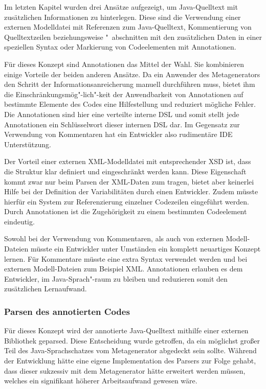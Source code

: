 \documentclass[12pt,oneside,a4paper,parskip]{scrbook}
\begin{document}
Im letzten Kapitel wurden drei Ansätze aufgezeigt, um Java-Quelltext mit zusätzlichen Informationen zu hinterlegen. Diese sind die Verwendung einer externen Modelldatei mit Referenzen zum Java-Quelltext, Kommentierung von Quelltextzeilen beziehungsweise "~abschnitten mit den zusätzlichen Daten in einer speziellen Syntax oder Markierung von Codeelementen mit Annotationen.

Für dieses Konzept sind Annotationen das Mittel der Wahl. Sie kombinieren einige Vorteile der beiden anderen Ansätze. Da ein Anwender des Metagenerators den Schritt der Informationsanreicherung manuell durchführen muss, bietet ihm die Einschränkungsmög"-lich"-keit der Anwendbarkeit von Annotationen auf bestimmte Elemente des Codes eine Hilfestellung und reduziert mögliche Fehler. Die Annotationen sind hier eine verteilte interne DSL und somit stellt jede Annotationen ein Schlüsselwort dieser internen DSL dar. Im Gegensatz zur Verwendung von Kommentaren hat ein Entwickler also rudimentäre IDE Unterstützung.

Der Vorteil einer externen XML-Modelldatei mit entsprechender XSD ist, dass die Struktur klar definiert und eingeschränkt werden kann. Diese Eigenschaft kommt zwar nur beim Parsen der XML-Daten zum tragen, bietet aber keinerlei Hilfe bei der Definition der Variabilitäten durch einen Entwickler. Zudem müsste hierfür ein System zur Referenzierung einzelner Codezeilen eingeführt werden. Durch Annotationen ist die Zugehörigkeit zu einem bestimmten Codeelement eindeutig.

Sowohl bei der Verwendung von Kommentaren, als auch von externen Modell-Dateien müsste ein Entwickler unter Umständen ein komplett neuartiges Konzept lernen. Für Kommentare müsste eine extra Syntax verwendet werden und bei externen Modell-Dateien zum Beispiel XML. Annotationen erlauben es dem Entwickler, im Java-Sprach"-raum zu bleiben und reduzieren somit den zusätzlichen Lernaufwand.

\subsubsection{Parsen des annotierten Codes}

Für dieses Konzept wird der annotierte Java-Quelltext mithilfe einer externen Bibliothek geparsed. Diese Entscheidung wurde getroffen, da ein möglichst großer Teil des Java-Sprachschatzes vom Metagenerator abgedeckt sein sollte. Während der Entwicklung hätte eine eigene Implementation des Parsers zur Folge gehabt, dass dieser sukzessiv mit dem Metagenerator hätte erweitert werden müssen, welches ein signifikant höherer Arbeitsaufwand gewesen wäre.
\end{document}
